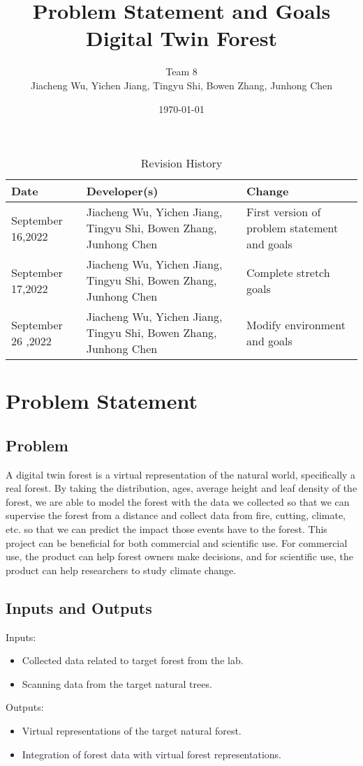 \documentclass{article}
\title{Problem Statement and Goals\\ Digital Twin Forest}
\author{Team 8\\Jiacheng Wu, Yichen Jiang, Tingyu Shi, Bowen Zhang, Junhong Chen}
\date{\today}
\begin{document}
\maketitle

\begin{table}[hp]
\centering
\caption{Revision History} \label{TblRevisionHistory}
\begin{tabularx}{11cm}{X X X}
\toprule
\textbf{Date} & \textbf{Developer(s)} & \textbf{Change}\\
\midrule
September 16,2022 & Jiacheng Wu, Yichen Jiang, Tingyu Shi, Bowen Zhang, Junhong Chen & First version of problem statement and goals\\
\hline
September 17,2022 & Jiacheng Wu, Yichen Jiang, Tingyu Shi, Bowen Zhang, Junhong Chen & Complete stretch goals\\
September 26 ,2022 & Jiacheng Wu, Yichen Jiang, Tingyu Shi, Bowen Zhang, Junhong Chen & Modify environment and goals\\
\bottomrule
\end{tabularx}
\end{table}

\section{Problem Statement}
\subsection{Problem}
A digital twin forest is a virtual representation of the natural world, specifically a real forest. By taking the distribution, ages, average height and leaf density of the forest, we are able to model the forest with the data we collected so that we can supervise the forest from a distance and collect data from fire, cutting, climate, etc. so that we can predict the impact those events have to the forest. This project can be beneficial for both commercial and scientific use. For commercial use, the product can help forest owners make decisions, and for scientific use, the product can help researchers to study climate change.

\subsection{Inputs and Outputs}

Inputs:
\begin{itemize}
    \item Collected data related to target forest from the lab. 
    \item Scanning data from the target natural trees.
\end{itemize}
Outputs:
\begin{itemize}
    \item Virtual representations of the target natural forest.
    \item Integration of forest data with virtual forest representations.
\end{itemize}
\end{document}
